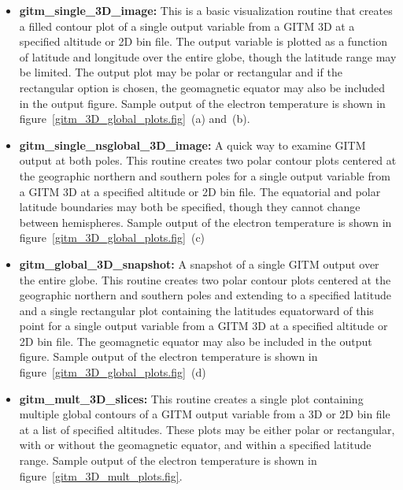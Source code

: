 \begin{itemize}
\item[]{{\bf gitm\_single\_3D\_image:}  This is a basic visualization routine that creates a filled contour plot of a single output variable from a GITM 3D at a specified altitude or 2D bin file.  The output variable is plotted as a function of latitude and longitude over the entire globe, though the latitude range may be limited.  The output plot may be polar or rectangular and if the rectangular option is chosen, the geomagnetic equator may also be included in the output figure.  Sample output of the electron temperature is shown in figure~\ref{gitm_3D_global_plots.fig}~(a) and~(b).}
\item[]{{\bf gitm\_single\_nsglobal\_3D\_image:}  A quick way to examine GITM output at both poles.  This routine creates two polar contour plots centered at the geographic northern and southern poles for a single output variable from a GITM 3D at a specified altitude or 2D bin file.  The equatorial and polar latitude boundaries may both be specified, though they cannot change between hemispheres.  Sample output of the electron temperature is shown in figure~\ref{gitm_3D_global_plots.fig}~(c)}
\item[]{{\bf gitm\_global\_3D\_snapshot:}  A snapshot of a single GITM output over the entire globe.  This routine creates two polar contour plots centered at the geographic northern and southern poles and extending to a specified latitude and a single rectangular plot containing the latitudes equatorward of this point for a single output variable from a GITM 3D at a specified altitude or 2D bin file.  The geomagnetic equator may also be included in the output figure.  Sample output of the electron temperature is shown in figure~\ref{gitm_3D_global_plots.fig}~(d)}
\item[]{{\bf gitm\_mult\_3D\_slices:}  This routine creates a single plot containing multiple global contours of a GITM output variable from a 3D or 2D bin file at a list of specified altitudes.  These plots may be either polar or rectangular, with or without the geomagnetic equator, and within a specified latitude range.  Sample output of the electron temperature is shown in figure~\ref{gitm_3D_mult_plots.fig}.}
\end{itemize}

